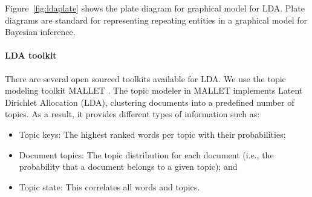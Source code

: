  Figure~\ref{fig:ldaplate} shows the plate diagram for graphical model for LDA. Plate diagrams are standard for representing repeating entities in a graphical model for Bayesian inference. 
 
 
 



\paragraph*{LDA toolkit}

There are several  open sourced toolkits available for LDA. We use the topic modeling toolkit MALLET \cite{McCallumMALLET}.  The
topic modeler in MALLET implements Latent Dirichlet Allocation (LDA), clustering
documents into a predefined number of topics. As a result, it provides
different types of information such as:

\begin{itemize}
	\item  Topic keys:  The highest ranked words per topic with their probabilities; 
	
	\item Document topics: The topic distribution for each document (i.e., the probability that a document belongs to a given topic); and 
	
	\item Topic state: This correlates all words and topics.
	
\end{itemize}






